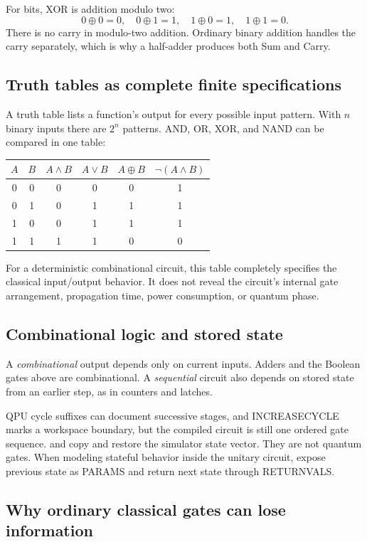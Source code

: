 For bits, XOR is addition modulo two:
\[
0\oplus0=0,\quad 0\oplus1=1,\quad
1\oplus0=1,\quad 1\oplus1=0.
\]
There is no carry in modulo-two addition. Ordinary binary addition handles the
carry separately, which is why a half-adder produces both Sum and Carry.

\subsection{Truth tables as complete finite specifications}

A truth table lists a function's output for every possible input pattern. With
$n$ binary inputs there are $2^n$ patterns. AND, OR, XOR, and NAND can be
compared in one table:
\begin{center}
\begin{tabular}{cc|cccc}
\toprule
$A$&$B$&$A\land B$&$A\lor B$&$A\oplus B$&$\neg(A\land B)$\\
\midrule
0&0&0&0&0&1\\
0&1&0&1&1&1\\
1&0&0&1&1&1\\
1&1&1&1&0&0\\
\bottomrule
\end{tabular}
\end{center}
For a deterministic combinational circuit, this table completely specifies
the classical input/output behavior. It does not reveal the circuit's internal
gate arrangement, propagation time, power consumption, or quantum phase.

\subsection{Combinational logic and stored state}

A \emph{combinational} output depends only on current inputs. Adders and the
Boolean gates above are combinational. A \emph{sequential} circuit also depends
on stored state from an earlier step, as in counters and latches.

QPU cycle suffixes can document successive stages, and INCREASECYCLE marks a
workspace boundary, but the compiled circuit is still one ordered gate
sequence.  and  copy and restore the simulator
state vector. They are not quantum gates. When modeling stateful behavior
inside the unitary circuit, expose previous state as PARAMS and return next
state through RETURNVALS.

\subsection{Why ordinary classical gates can lose information}

